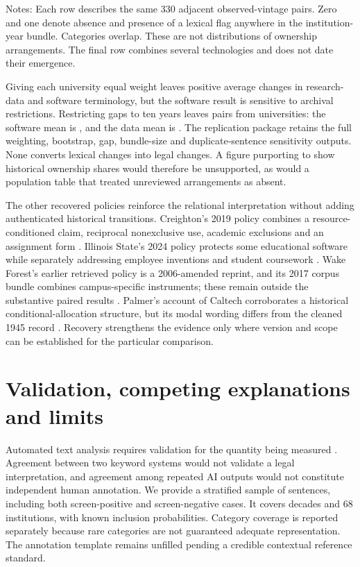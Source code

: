 \documentclass[12pt]{article}
\begin{document}
\begin{table}[htbp]
\centering\caption{Within-university transitions in category mentions}\label{tab:transitions}
\small
\par\smallskip\footnotesize\raggedright Notes: Each row describes the same 330 adjacent observed-vintage pairs. Zero and one denote absence and presence of a lexical flag anywhere in the institution-year bundle. Categories overlap. These are not distributions of ownership arrangements. The final row combines several technologies and does not date their emergence.
\end{table}

Giving each university equal weight leaves positive average changes in research-data and software terminology, but the software result is sensitive to archival restrictions. Restricting gaps to ten years leaves \ShortPairs{} pairs from \ShortUniversities{} universities: the software mean is \ShortSoftware{}, and the data mean is \ShortData{}. The replication package retains the full weighting, bootstrap, gap, bundle-size and duplicate-sentence sensitivity outputs. None converts lexical changes into legal changes. A figure purporting to show historical ownership shares would therefore be unsupported, as would a population table that treated unreviewed arrangements as absent.

The other recovered policies reinforce the relational interpretation without adding authenticated historical transitions. Creighton's 2019 policy combines a resource-conditioned claim, reciprocal nonexclusive use, academic exclusions and an assignment form \citep[sections C, D.2 and Appendix I]{creighton2019}. Illinois State's 2024 policy protects some educational software while separately addressing employee inventions and student coursework \citep[sections 2.9, 2.12 and 3.1--3.2]{isu2024}. Wake Forest's earlier retrieved policy is a 2006-amended reprint, and its 2017 corpus bundle combines campus-specific instruments; these remain outside the substantive paired results \citep{wfu2006,wfu2017}. Palmer's account of Caltech corroborates a historical conditional-allocation structure, but its modal wording differs from the cleaned 1945 record \citep[pp. 55--57]{palmer1962}. Recovery strengthens the evidence only where version and scope can be established for the particular comparison.

\section{Validation, competing explanations and limits}
Automated text analysis requires validation for the quantity being measured \citep{grimmer2013,gentzkow2019}. Agreement between two keyword systems would not validate a legal interpretation, and agreement among repeated AI outputs would not constitute independent human annotation. We provide a stratified sample of \ValidationN{} sentences, including both screen-positive and screen-negative cases. It covers decades and 68 institutions, with known inclusion probabilities. Category coverage is reported separately because rare categories are not guaranteed adequate representation. The annotation template remains unfilled pending a credible contextual reference standard.
\end{document}
